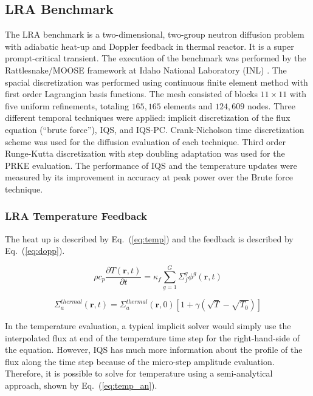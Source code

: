\documentclass{anstrans}
\renewcommand{\vec}[1]{\bm{#1}} %
\newcommand{\eqt}[1]{Eq.~(\ref{#1})}                     %
\newcommand{\be}{\begin{equation}}
\newcommand{\ee}{\end{equation}}
\begin{document}
\subsection{LRA Benchmark}

The LRA benchmark is a two-dimensional, two-group neutron diffusion problem with adiabatic heat-up and Doppler feedback in thermal reactor.  It is a super prompt-critical transient. The execution of the benchmark was performed by the Rattlesnake/MOOSE framework at Idaho National Laboratory (INL) \cite{wang2013}.  The spacial discretization was performed using continuous finite element method with first order Lagrangian basis functions. The mesh consisted of blocks $11\times 11$ with five uniform refinements, totaling $165,165$ elements and $124,609$ nodes. Three different temporal techniques were applied: implicit discretization of the flux equation (``brute force''), IQS, and IQS-PC. Crank-Nicholson time discretization scheme was used for the diffusion evaluation of each technique.  Third order Runge-Kutta discretization with step doubling adaptation was used for the PRKE evaluation.  The performance of IQS and the temperature updates were measured by its improvement in accuracy at peak power over the Brute force technique.

\subsubsection{LRA Temperature Feedback}
\label{sec:LRA_T}

The heat up is described by \eqt{eq:temp} and the feedback is described by \eqt{eq:dopp}.

\be
\rho c_p \frac{\partial T(\vec{r},t)}{\partial t} = \kappa_f \sum^G_{g=1}\Sigma_f^g \phi^g(\vec{r},t)
\label{eq:temp}
\ee

\be
\Sigma_a^{thermal}(\vec{r},t) = \Sigma_a^{thermal}(\vec{r},0)\left[1+\gamma\left(\sqrt{T}-\sqrt{T_0}\right)\right]
\label{eq:dopp}
\ee

In the temperature evaluation, a typical implicit solver would simply use the interpolated flux at end of the temperature time step for the right-hand-side of the equation.  However, IQS has much more information about the profile of the flux along the time step because of the micro-step amplitude evaluation.  Therefore, it is possible to solve for temperature using a semi-analytical approach, shown by \eqt{eq:temp_an}.
\end{document}
